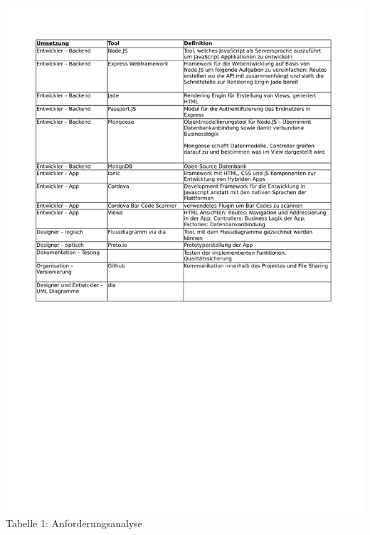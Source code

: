 \documentclass[12pt,a4paper]{article}
\begin{document}
\hspace*{-10mm} \includegraphics[trim = 17mm 130mm 0mm 20mm]{Anforderungskatalog.pdf}
\\
\footnotesize Tabelle 1: Anforderungsanalyse
\normalsize
\\
\newpage
\end{document}
